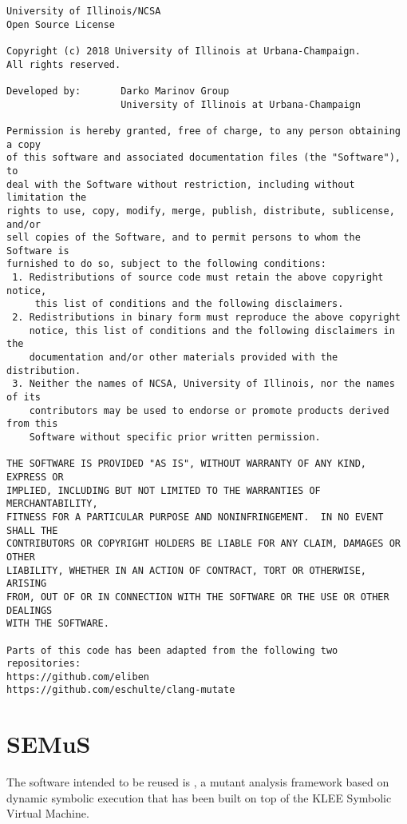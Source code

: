 \begin{lstlisting}[language={}]
University of Illinois/NCSA
Open Source License

Copyright (c) 2018 University of Illinois at Urbana-Champaign.
All rights reserved.

Developed by:       Darko Marinov Group
                    University of Illinois at Urbana-Champaign

Permission is hereby granted, free of charge, to any person obtaining a copy
of this software and associated documentation files (the "Software"), to
deal with the Software without restriction, including without limitation the
rights to use, copy, modify, merge, publish, distribute, sublicense, and/or
sell copies of the Software, and to permit persons to whom the Software is
furnished to do so, subject to the following conditions:
 1. Redistributions of source code must retain the above copyright notice,
     this list of conditions and the following disclaimers.
 2. Redistributions in binary form must reproduce the above copyright
    notice, this list of conditions and the following disclaimers in the
    documentation and/or other materials provided with the distribution.
 3. Neither the names of NCSA, University of Illinois, nor the names of its
    contributors may be used to endorse or promote products derived from this
    Software without specific prior written permission.

THE SOFTWARE IS PROVIDED "AS IS", WITHOUT WARRANTY OF ANY KIND, EXPRESS OR
IMPLIED, INCLUDING BUT NOT LIMITED TO THE WARRANTIES OF MERCHANTABILITY,
FITNESS FOR A PARTICULAR PURPOSE AND NONINFRINGEMENT.  IN NO EVENT SHALL THE
CONTRIBUTORS OR COPYRIGHT HOLDERS BE LIABLE FOR ANY CLAIM, DAMAGES OR OTHER
LIABILITY, WHETHER IN AN ACTION OF CONTRACT, TORT OR OTHERWISE, ARISING
FROM, OUT OF OR IN CONNECTION WITH THE SOFTWARE OR THE USE OR OTHER DEALINGS
WITH THE SOFTWARE.

Parts of this code has been adapted from the following two repositories:
https://github.com/eliben
https://github.com/eschulte/clang-mutate
\end{lstlisting}

\section{SEMuS}

The software intended to be reused is \SEMU, a mutant analysis framework based on dynamic symbolic execution that has been built on top of the KLEE Symbolic Virtual Machine.

